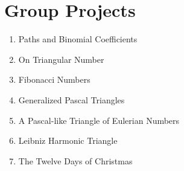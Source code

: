 \documentclass[10pt,]{book}
\theoremstyle{plain}
\theoremstyle{definition}
\theoremstyle{definition}
\theoremstyle{definition}
\numberwithin{equation}{chapter}
\begin{document}
%
%
%
\appendix
%
\typeout{************************************************}
\typeout{************************************************}
\chapter[{Group Projects}]{Group Projects}\label{app_projects}
\hypertarget{p-1650}{}%
\leavevmode%
\begin{enumerate}
\item\hypertarget{li-70}{}Paths and Binomial Coefficients%
\item\hypertarget{li-71}{}On Triangular Number%
\item\hypertarget{li-72}{}Fibonacci Numbers%
\item\hypertarget{li-73}{}Generalized Pascal Triangles%
\item\hypertarget{li-74}{}A Pascal-like Triangle of Eulerian Numbers%
\item\hypertarget{li-75}{}Leibniz Harmonic Triangle%
\item\hypertarget{li-76}{}The Twelve Days of Christmas%
\end{enumerate}
%
\typeout{************************************************}
\typeout{************************************************}
\end{document}

